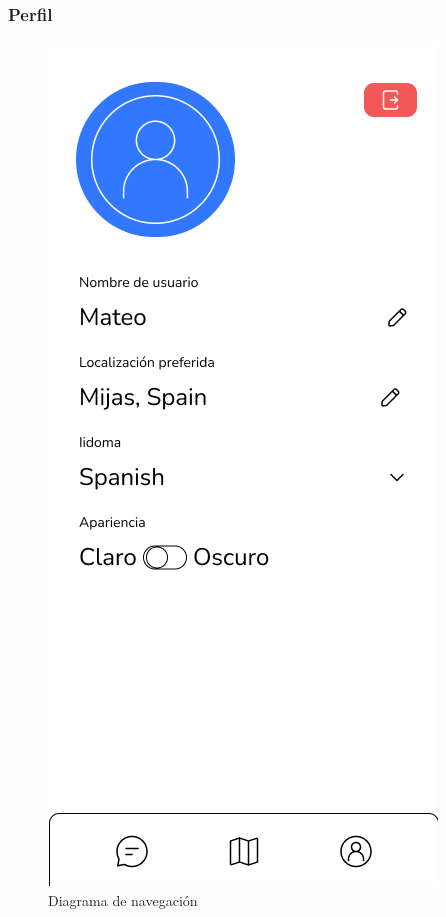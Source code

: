 \subsubsection{Perfil}
\begin{figure}[H]
        \centering
        \includegraphics[cframe=black 2pt,width=0.3\linewidth]{images/vistas/PerfilUsuario.png}
        \caption{Diagrama de navegación}
        \label{fig:Vista Perfil}
\end{figure}





